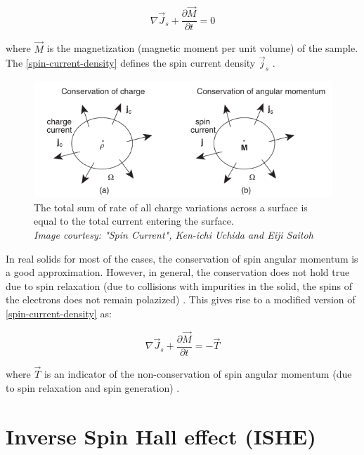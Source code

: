 \begin{equation} \label{spin-current-density}
    \nabla \vec{J}_s + \frac{\partial \vec{M}}{\partial t} = 0
\end{equation}

where $ \vec{M} $ is the magnetization (magnetic moment per unit volume) of the sample. The \cref{spin-current-density} defines the spin current density $ \vec{j}_s $ \cite{Uchida_2016}.

\begin{figure}[h!]
    \centering
    \includegraphics[scale=0.6]{spin-current.png}
    \caption{The total sum of rate of all charge variations across a surface is equal to the total current entering the surface.\\ \vspace{0.2cm} \textit{Image courtesy: "Spin Current", Ken-ichi Uchida and Eiji Saitoh}}
\end{figure}


In real solids for most of the cases, the conservation of spin angular momentum is a good approximation. However, in general, the conservation does not hold true due to spin relaxation (due to collisions with impurities in the solid, the spins of the electrons does not remain polazized) \cite{Uchida_2016}. This gives rise to a modified version of \cref{spin-current-density} as:

\begin{equation}
    \nabla \vec{J}_s + \frac{\partial \vec{M}}{\partial t} = -\vec{T}
\end{equation}

where $ \vec{T} $ is an indicator of the non-conservation of spin angular momentum (due to spin relaxation and spin generation) \cite{Uchida_2016}.

\section{Inverse Spin Hall effect (ISHE)}

\label{sec:ishe}

